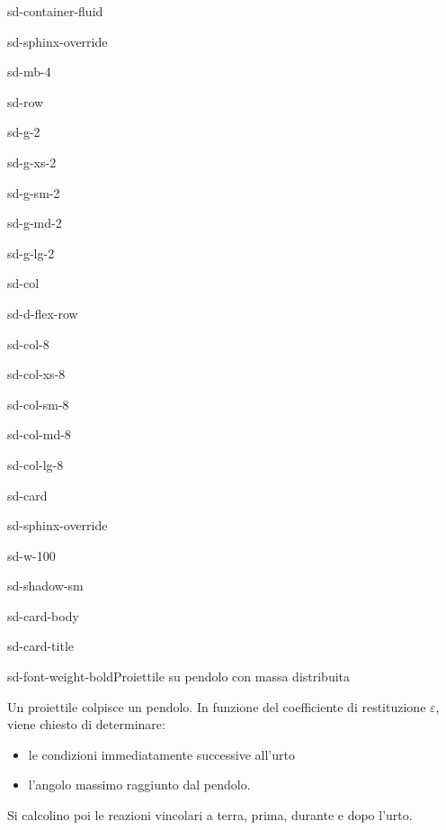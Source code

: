 \documentclass[letterpaper,10pt,italian]{jupyterBook}
\begin{document}
\begin{sphinxuseclass}{sd-container-fluid}
\begin{sphinxuseclass}{sd-sphinx-override}
\begin{sphinxuseclass}{sd-mb-4}
\begin{sphinxuseclass}{sd-row}
\begin{sphinxuseclass}{sd-g-2}
\begin{sphinxuseclass}{sd-g-xs-2}
\begin{sphinxuseclass}{sd-g-sm-2}
\begin{sphinxuseclass}{sd-g-md-2}
\begin{sphinxuseclass}{sd-g-lg-2}
\begin{sphinxuseclass}{sd-col}
\begin{sphinxuseclass}{sd-d-flex-row}
\begin{sphinxuseclass}{sd-col-8}
\begin{sphinxuseclass}{sd-col-xs-8}
\begin{sphinxuseclass}{sd-col-sm-8}
\begin{sphinxuseclass}{sd-col-md-8}
\begin{sphinxuseclass}{sd-col-lg-8}
\begin{sphinxuseclass}{sd-card}
\begin{sphinxuseclass}{sd-sphinx-override}
\begin{sphinxuseclass}{sd-w-100}
\begin{sphinxuseclass}{sd-shadow-sm}
\begin{sphinxuseclass}{sd-card-body}
\begin{sphinxuseclass}{sd-card-title}
\begin{sphinxuseclass}{sd-font-weight-bold}Proiettile su pendolo con massa distribuita
\end{sphinxuseclass}
\end{sphinxuseclass}
\sphinxAtStartPar
Un proiettile colpisce un pendolo. In funzione del coefficiente di restituzione \(\varepsilon\), viene chiesto di determinare:
\begin{itemize}
\item {} 
\sphinxAtStartPar
le condizioni immediatamente successive all’urto

\item {} 
\sphinxAtStartPar
l’angolo massimo raggiunto dal pendolo.

\end{itemize}

\sphinxAtStartPar
Si calcolino poi le reazioni vincolari a terra, prima, durante e dopo l’urto.


\end{sphinxuseclass}
\end{sphinxuseclass}
\end{sphinxuseclass}
\end{sphinxuseclass}
\end{sphinxuseclass}
\end{sphinxuseclass}
\end{sphinxuseclass}
\end{sphinxuseclass}
\end{sphinxuseclass}
\end{sphinxuseclass}
\end{sphinxuseclass}
\end{sphinxuseclass}
\end{sphinxuseclass}
\end{sphinxuseclass}
\end{sphinxuseclass}
\end{sphinxuseclass}
\end{sphinxuseclass}
\end{sphinxuseclass}
\end{sphinxuseclass}
\end{sphinxuseclass}
\end{sphinxuseclass}
\end{document}
